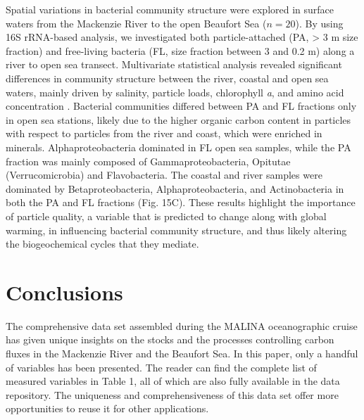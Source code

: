 \documentclass[essd, manuscript]{copernicus}
\begin{document}
Spatial variations in bacterial community structure were explored in surface waters from the Mackenzie River to the open Beaufort Sea ($n = 20$). By using 16S rRNA-based analysis, we investigated both particle-attached (PA, > 3 \textmu m size fraction) and free-living bacteria (FL, size fraction between 3 and 0.2 \textmu m) along a river to open sea transect. Multivariate statistical analysis revealed significant differences in community structure between the river, coastal and open sea waters, mainly driven by salinity, particle loads, chlorophyll \textit{a}, and amino acid concentration \citep{Ortega-Retuerta2013}. Bacterial communities differed between PA and FL fractions only in open sea stations, likely due to the higher organic carbon content in particles with respect to particles from the river and coast, which were enriched in minerals. Alphaproteobacteria dominated in FL open sea samples, while the PA fraction was mainly composed of Gammaproteobacteria, Opitutae (Verrucomicrobia) and Flavobacteria. The coastal and river samples were dominated by Betaproteobacteria, Alphaproteobacteria, and Actinobacteria in both the PA and FL fractions (Fig. 15C). These results highlight the importance of particle quality, a variable that is predicted to change along with global warming, in influencing bacterial community structure, and thus likely altering the biogeochemical cycles that they mediate. 

\section{Conclusions}

The comprehensive data set assembled during the MALINA oceanographic cruise has given unique insights on the stocks and the processes controlling carbon fluxes in the Mackenzie River and the Beaufort Sea. In this paper, only a handful of variables has been presented. The reader can find the complete list of measured variables in Table 1, all of which are also fully available in the data repository. The uniqueness and comprehensiveness of this data set offer more opportunities to reuse it for other applications.

\end{document}
